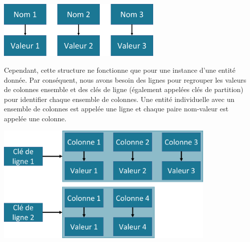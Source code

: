 \documentclass[12pt, letterpaper]{report}
\begin{document}
\begin{center}
	\includegraphics[width=0.6\textwidth]{carte}
\end{center}

\justifying
Cependant, cette structure ne fonctionne que pour une instance d’une entité donnée. Par conséquent, nous avons besoin des lignes pour regrouper les valeurs de colonnes ensemble et des clés de ligne (également appelées clés de partition) pour identifier chaque ensemble de colonnes. Une entité individuelle avec un ensemble de colonnes est appelée une ligne et chaque paire nom-valeur est appelée une colonne.
\begin{center}
	\includegraphics[width=0.8\textwidth]{columnfam}
\end{center}
\end{document}
